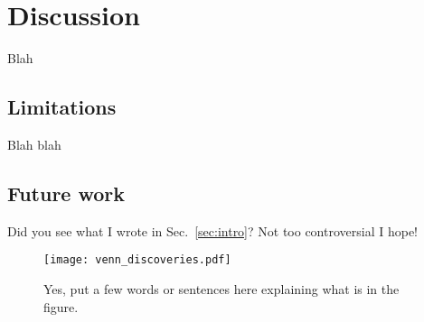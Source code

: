 \documentclass[12pt,a4paper]{article}
\begin{document}
\section{Discussion}\label{sec:discussion}

Blah

\subsection{Limitations}\label{sec:limitations}

Blah blah

\subsection{Future work}\label{sec:future}

Did you see what I wrote in Sec.~\ref{sec:intro}? Not too controversial I hope!

\begin{figure}[htbp!]
\begin{center}
\texttt{[image: venn\_discoveries.pdf]}
\end{center}
\caption{Yes, put a few words or sentences here explaining what is in the figure.}
\label{fig:venn}
\end{figure}



\end{document}
